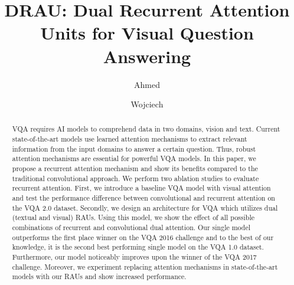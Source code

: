 \documentclass[times,twocolumn, final ,authoryear]{elsarticle}
\begin{document}
  	
  	
  	\ifpreprint
  	\setcounter{page}{1}
  	\else
  	\setcounter{page}{1}
  	\fi
  	
  	\begin{frontmatter}
  		
  		\title{DRAU: Dual Recurrent Attention Units for Visual Question Answering}
  		
  		\author[add1]{Ahmed }
  		\author[add1]{Wojciech }

		\address[add1]{Fraunhofer Heinrich Hertz Institute, Einsteinufer 37, Berlin 10587, Germany}
  		
	\begin{acronym}[JSONP]\itemsep0pt %
	\end{acronym}

  		
	\begin{abstract}
		\ac{VQA} requires AI models to comprehend data in two domains, vision and text. Current state-of-the-art models use learned attention mechanisms to extract relevant information from the input domains to answer a certain question. Thus, robust attention mechanisms are essential for powerful VQA models. In this paper, we propose a recurrent attention mechanism and show its benefits compared to the traditional convolutional approach.  We perform two ablation studies to evaluate recurrent attention. First, we introduce a baseline \ac{VQA} model with visual attention and test the performance difference between convolutional and recurrent attention on the VQA 2.0 dataset. Secondly, we design an architecture for VQA which utilizes dual (textual and visual) \acp{RAU}. Using this model, we show the effect of all possible combinations of recurrent and convolutional dual attention. Our single model outperforms the first place winner on the VQA 2016 challenge and to the best of our knowledge, it is the second best performing single model on the VQA 1.0 dataset. Furthermore, our model noticeably improves upon the winner of the VQA 2017 challenge. Moreover, we experiment replacing attention mechanisms in state-of-the-art models with our \acp{RAU} and show increased performance. 
		
	\end{abstract}
  		
  \end{frontmatter}
\end{document}
